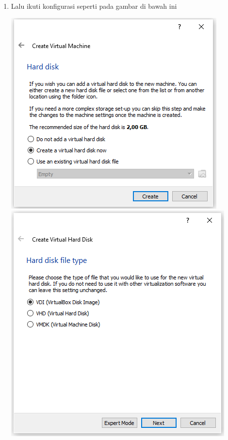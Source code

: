 \documentclass{article}
\begin{document}
\begin{flushleft}
\begin{enumerate}
			\item Lalu ikuti konfigurasi seperti pada gambar di bawah ini
        		\begin{center}
        			\includegraphics[scale=0.6]{(4)}
        			\includegraphics[scale=0.6]{(5)}  

\end{center}
\end{enumerate}
\end{flushleft}
\end{document}
